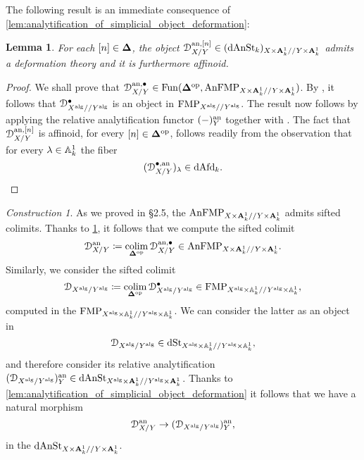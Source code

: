 \documentclass[10pt,a4paper,reqno]{amsart} %
\theoremstyle{plain}
\newtheorem{lem}[thm]{Lemma}
\theoremstyle{definition}
\theoremstyle{remark}
\numberwithin{equation}{section}
\newtheorem{construction}[thm]{Construction}
\begin{document}
The following result is an immediate consequence of \cref{lem:analytification_of_simplicial_object_deformation}:

\begin{lem} \label{lem:deformation_theory_for_D^an_bullet_X/Y}
    For each $[n] \in \bm{\Delta}$, the object $\mathcal D_{X/Y}^{\mathrm{an}, [n]} \in (\mathrm{dAnSt}_k)_{X \times \mathbf A^1_k/ /Y \times \mathbf A^1_k}$ admits a deformation theory and it is furthermore affinoid.
\end{lem}

\begin{proof}
    We shall prove that $\mathcal D^{ \mathrm{an}, \bullet}_{X/ Y} \in \operatorname{Fun}(\bm{\Delta} ^\mathrm{op}, \mathrm{AnFMP}_{X \times \mathbf A^1_k/ /Y\times\mathbf A^1_k})$. By \cite[Lemma 2.3.2]{Gaitsgory_Study_II}, it follows
    that $\mathcal D^\bullet_{X^\mathrm{alg}/ /Y^\mathrm{alg}}$ is an object in $\mathrm{FMP}_{X^\mathrm{alg}/ /Y^\mathrm{alg}}$. The result now follows by applying the relative analytification functor $(-)_Y^\mathrm{an}$ together with
    \cite[Proposition 6.10]{Porta_Yu_NQK}. The fact that
    $\mathcal D^{\mathrm{an}, [n]}_{X/Y}$ is affinoid, for every $[n] \in \bm{\Delta} ^\mathrm{op}$, follows readily from the observation that for every $\lambda \in \mathbb A^1_k$ the fiber
        \[
            (\mathcal D^{\bullet, \mathrm{an}}_{X/ Y})_\lambda \in \mathrm{dAfd}_k.  
        \]
\end{proof}


\begin{construction}
    As we proved in \S 2.5, the \infcat $\mathrm{AnFMP}_{X\times\mathbf A^1_k/ /Y\times\mathbf A^1_k}$ admits sifted colimits. Thanks to \cref{lem:deformation_theory_for_D^an_bullet_X/Y},
    it follows that we compute the sifted colimit
        \[
            \mathcal D^\mathrm{an}_{X/Y} \coloneqq \operatorname*{colim}_{\bm{\Delta} ^\mathrm{op}} \mathcal D^{\mathrm{an}, \bullet}_{X/Y} \in \mathrm{AnFMP}_{X\times\mathbf A^1_k/ /Y\times\mathbf A^1_k}.  
        \]
    Similarly, we consider the sifted colimit
        \[
            \mathcal D_{X^\mathrm{alg}/ Y^\mathrm{alg}} \coloneqq \operatorname*{colim}_{\bm{\Delta} ^\mathrm{op}} \mathcal D^\bullet_{X^\mathrm{alg}/ Y^\mathrm{alg}} \in \mathrm{FMP}_{X^\mathrm{alg} \times \mathbb A^1_k/ /Y^\mathrm{alg} \times \mathbb A^1_k} ,
        \]
    computed in the \infcat $\mathrm{FMP}_{X^\mathrm{alg}\times\mathbb A^1_k/ /Y^\mathrm{alg}\times\mathbb A^1_k}$. We can consider the latter as an object in
        \[
            \mathcal D_{X^\mathrm{alg}/ Y^\mathrm{alg}} \in \mathrm{dSt}_{X^\mathrm{alg} \times \mathbb A^1_k/ /Y^\mathrm{alg} \times \mathbb A^1_k},  
        \]
    and therefore consider its relative analytification $(\mathcal D_{X^\mathrm{alg}/ Y^\mathrm{alg}})^\mathrm{an}_Y \in \mathrm{dAnSt}_{X^\mathrm{alg} \times \mathbf A^1_k/ /Y^\mathrm{alg} \times \mathbf A^1_k}$. Thanks to
    \cref{lem:analytification_of_simplicial_object_deformation} it follows that we have a natural morphism
        \[
            \mathcal D^\mathrm{an}_{X/ Y} \to (\mathcal D_{X^\mathrm{alg}/ Y^\mathrm{alg}})^\mathrm{an}_Y,  
        \]
    in the \infcat $\mathrm{dAnSt}_{X \times \mathbf A^1_k/ /Y \times \mathbf A^1_k}$.
\end{construction}
\end{document}
